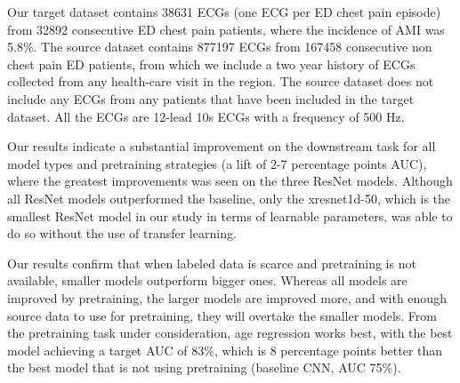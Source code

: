 \documentclass[journal,twoside,web]{ieeecolor}
\begin{document}
Our target dataset contains 38631 ECGs (one ECG per ED chest pain episode) from 32892 consecutive ED chest pain patients, where the incidence of AMI was 5.8\%. The source dataset contains 877197 ECGs from 167458 consecutive non chest pain ED patients, from which we include a two year history of ECGs collected from any health-care visit in the region. The source dataset does not include any ECGs from any patients that have been included in the target dataset. All the ECGs are 12-lead 10s ECGs with a frequency of 500 Hz. 

Our results indicate a substantial improvement on the downstream task for all model types and pretraining strategies (a lift of 2-7 percentage points AUC), where the greatest improvements was seen on the three ResNet models. Although all ResNet models outperformed the baseline, only the xresnet1d-50, which is the smallest ResNet model in our study in terms of learnable parameters, was able to do so without the use of transfer learning.




Our results confirm that when labeled data is scarce and pretraining is not available, smaller models outperform bigger ones. Whereas all models are improved by pretraining, the larger models are improved more, and with enough source data to use for pretraining, they will overtake the smaller models. From the pretraining task under consideration, age regression works best, with the best model achieving a target AUC of 83\%, which is 8 percentage points better than the best model that is not using pretraining (baseline CNN, AUC 75\%).






\end{document}
